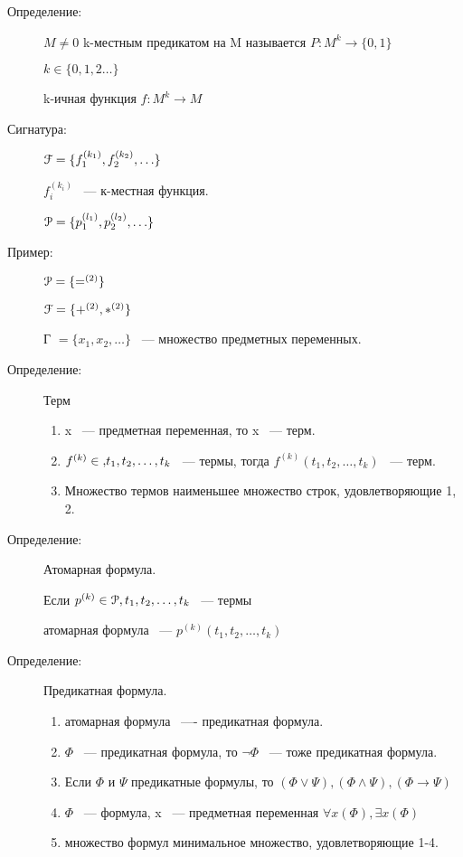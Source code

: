 \documentclass[12pt]{article}
\begin{document}
\begin{description}
\item[Определение:]

 $M \ne 0$ k-местным предикатом на M называется $P:M^k \to \{0, 1\}$

$k \in \{0, 1, 2\ldots\}$

k-ичная функция $f:M^k \to M$

\item[Сигнатура:] 
   
$\EuScript F = \{f_1^{(k_1)}, f_2^{(k_2)}, \ldots\}$

   $f_i^{(k_i)}$ ~--- к-местная функция. 
  
   $\EuScript P = \{p_1^{(l_1)}, p_2^{(l_2)}, \ldots\}$

\item[Пример:]

$\EuScript P = \{=^{(2)}\}$

$\EuScript F = \{+^{(2)}, *^{(2)}\}$

Г $= \{x_1, x_2, \ldots\}$ ~--- множество предметных переменных.

\item[Определение:] Терм

\begin{enumerate}
\item x ~--- предметная переменная, то x ~--- терм.
\item $f^{(k)} \in \EuScript, t_1, t_2, \ldots, t_k$ ~--- термы, тогда $f^{(k)}(t_1, t_2, \ldots, t_k)$ ~--- терм. 
\item Множество термов наименьшее множество строк, удовлетворяющие 1, 2.
\end{enumerate}

\item[Определение:] Атомарная формула.

    Если $p^{(k)} \in \EuScript P, t_1, t_2, \ldots, t_k$ ~--- термы

    атомарная формула ~--- $p^{(k)}(t_1, t_2, \ldots, t_k)$

\item[Определение:] Предикатная формула.

\begin{enumerate}

\item атомарная формула ~---- предикатная формула.

\item $\Phi$ ~--- предикатная формула, то $\neg \Phi$ ~--- тоже предикатная формула.

\item Если $\Phi$ и $\Psi$ предикатные формулы, то $(\Phi \vee \Psi), (\Phi \wedge \Psi), (\Phi \to \Psi)$

\item $\Phi$ ~--- формула, x ~--- предметная переменная $\forall x(\Phi), \exists x(\Phi)$

\item множество формул минимальное множество, удовлетворяющие 1-4.

\end{enumerate}
\end{description}
\end{document}
